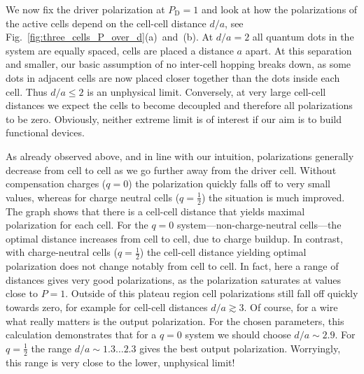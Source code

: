 We now fix the driver polarization at $P_\text{D} = 1$ and look at how the
polarizations of the active cells depend on the cell-cell distance $d/a$, see
Fig.~\ref{fig:three_cells_P_over_d}(a)~and~(b). At $d/a = 2$ all quantum dots in
the system are equally spaced, cells are placed a distance $a$ apart. At this
separation and smaller, our basic assumption of no inter-cell hopping breaks
down, as some dots in adjacent cells are now placed closer together than the
dots inside each cell. Thus $d/a \le 2$ is an unphysical limit. Conversely, at
very large cell-cell distances we expect the cells to become decoupled and
therefore all polarizations to be zero. Obviously, neither extreme limit is of
interest if our aim is to build functional  devices.

As already observed above, and in line with our intuition, polarizations
generally decrease from cell to cell as we go further away from the driver cell.
Without compensation charges ($q=0$) the polarization quickly falls off to very
small values, whereas for charge neutral cells ($q = \frac{1}{2}$) the situation
is much improved. The graph shows that there is a cell-cell distance that yields
maximal polarization for each cell. For the $q=0$ system---non-charge-neutral
cells---the optimal distance increases from cell to cell, due to charge buildup.
In contrast, with charge-neutral cells ($q=\frac{1}{2}$) the cell-cell distance
yielding optimal polarization does not change notably from cell to cell. In
fact, here a range of distances gives very good polarizations, as the
polarization saturates at values close to $P = 1$. Outside of this plateau
region cell polarizations still fall off quickly towards zero, for example for
cell-cell distances $d/a \gtrsim 3$. Of course, for a wire what really matters
is the output polarization. For the chosen parameters, this calculation
demonstrates that for a $q=0$ system we should choose $d/a \sim 2.9$. For
$q=\frac{1}{2}$ the range $d/a \sim 1.3 \ldots 2.3$ gives the best output
polarization. Worryingly, this range is very close to the lower, unphysical
limit!

